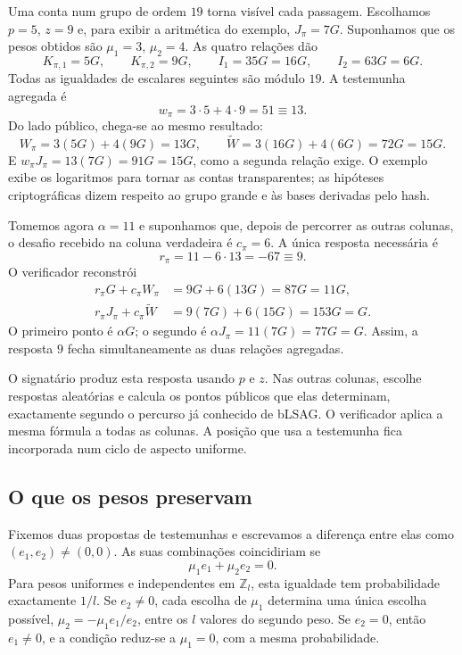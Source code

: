 Uma conta num grupo de ordem \(19\) torna visível cada passagem.
Escolhamos \(p=5\), \(z=9\) e, para exibir a aritmética do exemplo,
\(J_\pi=7G\). Suponhamos que os pesos obtidos são
\(\mu_1=3\), \(\mu_2=4\). As quatro relações dão
\[
 K_{\pi,1}=5G,\qquad K_{\pi,2}=9G,\qquad
 I_1=35G=16G,\qquad I_2=63G=6G.
\]
Todas as igualdades de escalares seguintes são módulo \(19\). A
testemunha agregada é
\[
 w_\pi=3\cdot5+4\cdot9=51\equiv13.
\]
Do lado público, chega-se ao mesmo resultado:
\[
 W_\pi=3(5G)+4(9G)=13G,\qquad
 \widetilde W=3(16G)+4(6G)=72G=15G.
\]
E \(w_\pi J_\pi=13(7G)=91G=15G\), como a segunda relação exige.
O exemplo exibe os logaritmos para tornar as contas transparentes;
as hipóteses criptográficas dizem respeito ao grupo grande e às bases
derivadas pelo hash.

Tomemos agora \(\alpha=11\) e suponhamos que, depois de percorrer as
outras colunas, o desafio recebido na coluna verdadeira é \(c_\pi=6\).
A única resposta necessária é
\[
 r_\pi=11-6\cdot13=-67\equiv9.
\]
O verificador reconstrói
\begin{align*}
 r_\pi G+c_\pi W_\pi
    &=9G+6(13G)=87G=11G,\\
 r_\pi J_\pi+c_\pi\widetilde W
    &=9(7G)+6(15G)=153G=G.
\end{align*}
O primeiro ponto é \(\alpha G\); o segundo é
\(\alpha J_\pi=11(7G)=77G=G\). Assim, a resposta \(9\) fecha
simultaneamente as duas relações agregadas.

O signatário produz esta resposta usando \(p\) e \(z\). Nas outras
colunas, escolhe respostas aleatórias e calcula os pontos públicos que
elas determinam, exactamente segundo o percurso já conhecido de bLSAG.
O verificador aplica a mesma fórmula a todas as colunas. A posição que
usa a testemunha fica incorporada num ciclo de aspecto uniforme.

\subsection*{O que os pesos preservam}

Fixemos duas propostas de testemunhas e escrevamos a diferença entre
elas como \((e_1,e_2)\ne(0,0)\). As suas combinações coincidiriam se
\[
 \mu_1e_1+\mu_2e_2=0.
\]
Para pesos uniformes e independentes em \(\mathbb Z_l\), esta
igualdade tem probabilidade exactamente \(1/l\). Se \(e_2\ne0\),
cada escolha de \(\mu_1\) determina uma única escolha possível,
\(\mu_2=-\mu_1e_1/e_2\), entre os \(l\) valores do segundo peso.
Se \(e_2=0\), então \(e_1\ne0\), e a condição reduz-se a
\(\mu_1=0\), com a mesma probabilidade.

